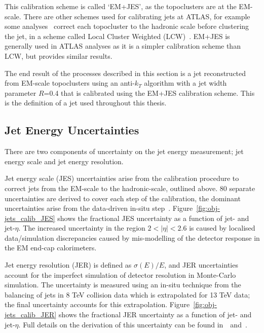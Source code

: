 This calibration scheme is called `EM+JES', as the topoclusters are at the EM-scale.
There are other schemes used for calibrating jets at ATLAS,
for example some analyses~\cite{obj-VVjj} correct each topocluster to the hadronic scale
before clustering the jet, in a scheme called Local Cluster Weighted (LCW)~\cite{obj-jets_topo}.
EM+JES is generally used in ATLAS analyses as it is a simpler calibration scheme than LCW, but provides similar results.

The end result of the processes described in this section is a jet
reconstructed from EM-scale topoclusters using an anti-$k_T$ algorithm with a jet width parameter $R$=0.4
that is calibrated using the EM+JES calibration scheme.
This is the definition of a jet used throughout this thesis.

\newpage

\subsection{Jet Energy Uncertainties}
\label{sec:obj-jets_uncert}

There are two components of uncertainty on the jet energy measurement; jet energy scale and jet energy resolution.

Jet energy scale (JES) uncertainties arise from the calibration procedure
to correct jets from the EM-scale to the hadronic-scale, outlined above.
80 separate uncertainties are derived to cover each step of the calibration,
the dominant uncertainties arise from the data-driven in-situ step~\cite{obj-jets_calib_run2}.
Figure~\ref{fig:obj-jets_calib_JES} shows the fractional JES uncertainty as a function of jet-\pT{} and jet-$\eta$.
The increased uncertainty in the region $2 < |\eta| < 2.6$ is caused by localised data/simulation discrepancies
caused by mis-modelling of the detector response in the EM end-cap calorimeters.



Jet energy resolution (JER) is defined as $\sigma(E)/E$, and JER uncertainties
account for the imperfect simulation of detector resolution in Monte-Carlo simulation.
The uncertainty is measured using an in-situ technique from the balancing of jets in 8 TeV collision data
which is extrapolated for 13 TeV data; the final uncertainty accounts for this extrapolation.
Figure~\ref{fig:obj-jets_calib_JER} shows the fractional JER uncertainty as a function of jet-\pT{} and jet-$\eta$.
Full details on the derivation of this uncertainty can be found in~\cite{obj-jets_calib_2015}~and~\cite{obj-jets_calib_JER_8TeV}.

